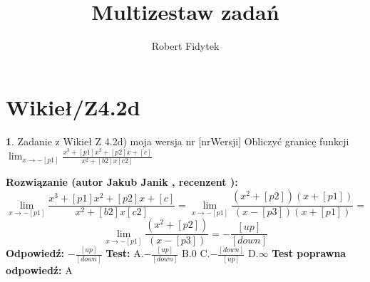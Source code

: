 \documentclass[12pt, a4paper]{article}
\title{Multizestaw zadań}
\author{Robert Fidytek}
\date{}
\theoremstyle{definition} %
\newtheorem{zad}{}
\newcommand{\kategoria}[1]{\section{#1}} %
\newcommand{\zadStart}[1]{\begin{zad}#1\newline} %
\newcommand{\zadStop}{\end{zad}}   %
\newcommand{\rozwStart}[2]{\noindent \textbf{Rozwiązanie (autor #1 , recenzent #2): }\newline} %
\newcommand{\rozwStop}{\newline}                                            %
\newcommand{\odpStart}{\noindent \textbf{Odpowiedź:}\newline}    %
\newcommand{\odpStop}{\newline}                                             %
\newcommand{\testStart}{\noindent \textbf{Test:}\newline} %
\newcommand{\testStop}{\newline} %
\newcommand{\kluczStart}{\noindent \textbf{Test poprawna odpowiedź:}\newline} %
\newcommand{\kluczStop}{\newline} %
\begin{document}
\maketitle


\kategoria{Wikieł/Z4.2d}
\zadStart{Zadanie z Wikieł Z 4.2d) moja wersja nr [nrWersji]}
Obliczyć granicę funkcji $\lim_{x \to -[p1]} \frac{x^3+[p1]x^2 +[p2]x+[c]}{x^2 + [b2]x [c2]}$
\zadStop
\rozwStart{Jakub Janik}{}
$$\lim_{x \to -[p1]} \frac{x^3+[p1]x^2 +[p2]x+[c]}{x^2 + [b2]x [c2]}=\lim_{x \to -[p1]} \frac{(x^2+[p2])(x+[p1])}{(x-[p3])(x+[p1])}=$$
$$\lim_{x \to -[p1]} \frac{(x^2+[p2])}{(x-[p3])}=-\frac{[up]}{[down]}$$
\rozwStop
\odpStart
$-\frac{[up]}{[down]}$
\odpStop
\testStart
A.$-\frac{[up]}{[down]}$
B.$0$
C.$-\frac{[down]}{[up]}$
D.$\infty$
\testStop
\kluczStart
A
\kluczStop
\end{document}

